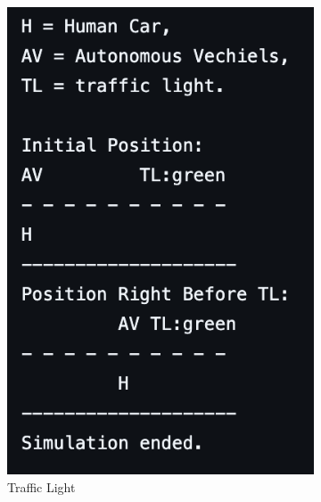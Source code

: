 \documentclass[conference]{IEEEtran}
\begin{document}
\begin{figure}[h]
\begin{subfigure}[b]{0.3\textwidth}
        \includegraphics[width=\linewidth]{Fig/Commonsense_S2.png}
        \caption{Traffic Light}
    \end{subfigure}
    \hfill
    \begin{subfigure}[b]{0.3\textwidth}

\end{subfigure}
\end{figure}
\end{document}
